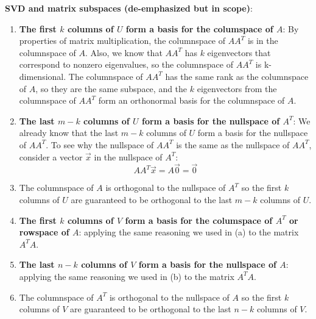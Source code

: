 \textbf{SVD and matrix subspaces (de-emphasized but in scope)}:
\begin{enumerate}
    \item \textbf{The first $k$ columns of $U$ form a basis for the columspace of $A$}: By properties of matrix multiplication, the columnspace of $AA^T$ is in the columnspace of $A$. Also, we know that $AA^T$ has $k$ eigenvectors that correspond to nonzero eigenvalues, so the columnspace of $AA^T$ is k-dimensional. The columnspace of $AA^T$ has the same rank as the columnspace of $A$, so they are the same subspace, and the $k$ eigenvectors from the columnspace of $AA^T$ form an orthonormal basis for the columnspace of $A$.  \\
    \item \textbf{The last $m - k$ columns of $U$ form a basis for the nullspace of $A^T$}: We already know that the last $m - k$ columns of $U$ form a basis for the nullspace of $AA^T$. To see why the nullspace of $AA^T$ is the same as the nullspace of $AA^T$, consider a vector $\vec{x}$ in the nullspace of $A^T$:
            $$AA^T \vec{x} = A \vec{0} = \vec{0}$$ 
    \item The columnspace of $A$ is orthogonal to the nullspace of $A^T$ so the first $k$ columns of $U$ are guaranteed to be orthogonal to the last $m - k$ columns of $U$.
    \item \textbf{The first $k$ columns of $V$ form a basis for the columspace of $A^T$ or rowspace of $A$}: applying the same reasoning we used in (a) to the matrix $A^TA$.
    \item \textbf{The last $n - k$ columns of $V$ form a basis for the nullspace of $A$}: applying the same reasoning we used in (b) to the matrix $A^TA$.
    \item The columnspace of $A^T$ is orthogonal to the nullspace of $A$ so the first $k$ columns of $V$ are guaranteed to be orthogonal to the last $n - k$ columns of $V$.
\end{enumerate}